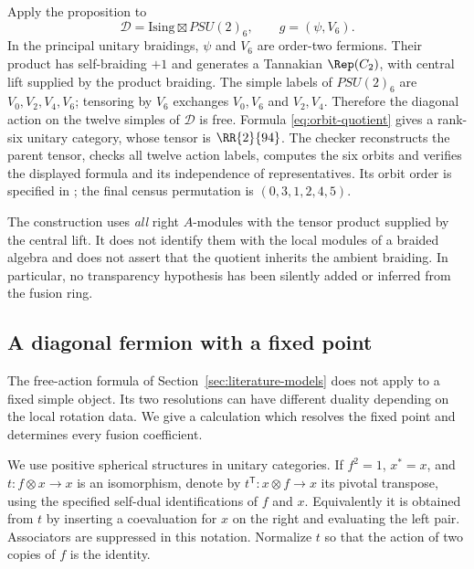 Apply the proposition to
\[
 \mathcal D=\mathrm{Ising}\boxtimes PSU(2)_6,
 \qquad g=(\psi,V_6).
\]
In the principal unitary braidings, $\psi$ and $V_6$ are order-two
fermions. Their product has self-braiding $+1$ and generates a
Tannakian $\Rep(C_2)$, with central lift supplied by the product braiding.
The simple labels of $PSU(2)_6$ are $V_0,V_2,V_4,V_6$; tensoring by
$V_6$ exchanges $V_0,V_6$ and $V_2,V_4$. Therefore the diagonal action
on the twelve simples of $\mathcal D$ is free. Formula
\eqref{eq:orbit-quotient} gives a rank-six unitary category, whose
tensor is $\RR{2}{94}$. The checker reconstructs the parent tensor,
checks all twelve action labels, computes the six orbits and verifies
the displayed formula and its independence of representatives. Its
orbit order is specified in ;
the final census permutation is $(0,3,1,2,4,5)$.

The construction uses \emph{all} right $A$-modules with the tensor
product supplied by the central lift. It does not identify them with
the local modules of a braided algebra and does not assert that the
quotient inherits the ambient braiding. In particular, no transparency
hypothesis has been silently added or inferred from the fusion ring.

\subsection{A diagonal fermion with a fixed point}\label{sec:fermionic-product}
The free-action formula of Section~\ref{sec:literature-models} does not
apply to a fixed simple object. Its two resolutions can have different
duality depending on the local rotation data. We give a calculation
which resolves the fixed point and determines every fusion coefficient.

We use positive spherical structures in unitary categories. If $f^2=1$,
$x^*=x$, and $t:f\otimes x\longrightarrow x$ is an isomorphism, denote
by $t^{\mathsf T}:x\otimes f\longrightarrow x$ its pivotal transpose,
using the specified self-dual identifications of $f$ and $x$. Equivalently
it is obtained from $t$ by inserting a coevaluation for $x$ on the right
and evaluating the left pair. Associators are suppressed in this notation.
Normalize $t$ so that the action of two copies of $f$ is the identity.

